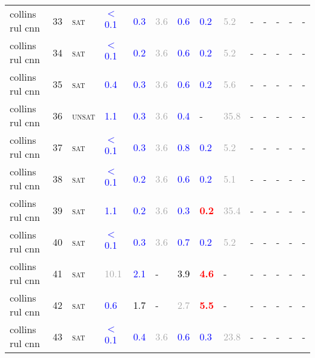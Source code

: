 \begin{center}
{\begin{longtable}{@{}llllllllllllll@{}}
collins rul cnn & 33 & \textsc{sat} & \textcolor{blue}{$<$0.1} & \textcolor{blue}{0.3} & \textcolor{darkgray}{3.6} & \textcolor{blue}{0.6} & \textcolor{blue}{0.2} & \textcolor{darkgray}{5.2} & - & - & - & - & - \\
collins rul cnn & 34 & \textsc{sat} & \textcolor{blue}{$<$0.1} & \textcolor{blue}{0.2} & \textcolor{darkgray}{3.6} & \textcolor{blue}{0.6} & \textcolor{blue}{0.2} & \textcolor{darkgray}{5.2} & - & - & - & - & - \\
collins rul cnn & 35 & \textsc{sat} & \textcolor{blue}{0.4} & \textcolor{blue}{0.3} & \textcolor{darkgray}{3.6} & \textcolor{blue}{0.6} & \textcolor{blue}{0.2} & \textcolor{darkgray}{5.6} & - & - & - & - & - \\
collins rul cnn & 36 & \textsc{unsat} & \textcolor{blue}{1.1} & \textcolor{blue}{0.3} & \textcolor{darkgray}{3.6} & \textcolor{blue}{0.4} & - & \textcolor{darkgray}{35.8} & - & - & - & - & - \\
collins rul cnn & 37 & \textsc{sat} & \textcolor{blue}{$<$0.1} & \textcolor{blue}{0.3} & \textcolor{darkgray}{3.6} & \textcolor{blue}{0.8} & \textcolor{blue}{0.2} & \textcolor{darkgray}{5.2} & - & - & - & - & - \\
collins rul cnn & 38 & \textsc{sat} & \textcolor{blue}{$<$0.1} & \textcolor{blue}{0.2} & \textcolor{darkgray}{3.6} & \textcolor{blue}{0.6} & \textcolor{blue}{0.2} & \textcolor{darkgray}{5.1} & - & - & - & - & - \\
collins rul cnn & 39 & \textsc{sat} & \textcolor{blue}{1.1} & \textcolor{blue}{0.2} & \textcolor{darkgray}{3.6} & \textcolor{blue}{0.3} & \textbf{\textcolor{red}{0.2}} & \textcolor{darkgray}{35.4} & - & - & - & - & - \\
collins rul cnn & 40 & \textsc{sat} & \textcolor{blue}{$<$0.1} & \textcolor{blue}{0.3} & \textcolor{darkgray}{3.6} & \textcolor{blue}{0.7} & \textcolor{blue}{0.2} & \textcolor{darkgray}{5.2} & - & - & - & - & - \\
collins rul cnn & 41 & \textsc{sat} & \textcolor{darkgray}{10.1} & \textcolor{blue}{2.1} & - & \textcolor{black}{3.9} & \textbf{\textcolor{red}{4.6}} & - & - & - & - & - & - \\
collins rul cnn & 42 & \textsc{sat} & \textcolor{blue}{0.6} & \textcolor{black}{1.7} & - & \textcolor{darkgray}{2.7} & \textbf{\textcolor{red}{5.5}} & - & - & - & - & - & - \\
collins rul cnn & 43 & \textsc{sat} & \textcolor{blue}{$<$0.1} & \textcolor{blue}{0.4} & \textcolor{darkgray}{3.6} & \textcolor{blue}{0.6} & \textcolor{blue}{0.3} & \textcolor{darkgray}{23.8} & - & - & - & - & - \\

\end{longtable}}
\end{center}
